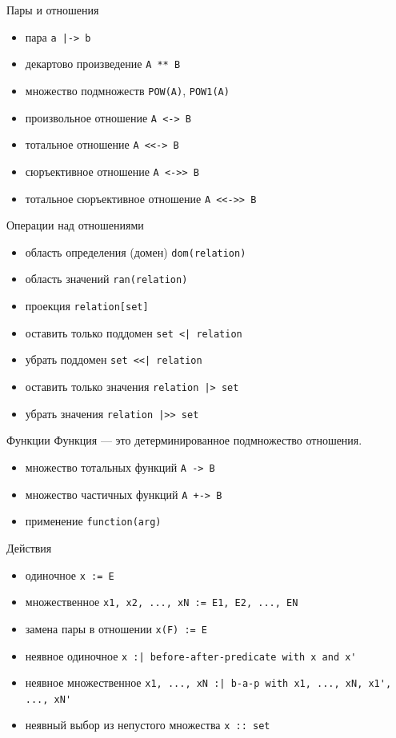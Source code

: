 \documentclass[hyperref={unicode=true}]{beamer}
\begin{document}
	\begin{frame}[fragile]{Пары и отношения}
		\begin{itemize}
			\item пара \verb`a |-> b`
			\item декартово произведение \verb|A ** B|
			\item множество подмножеств \verb|POW(A)|, \verb|POW1(A)|
			\item произвольное отношение \texttt{A <-> B}
			\item тотальное отношение \verb`A <<-> B`
			\item сюръективное отношение \verb`A <->> B`
			\item тотальное сюръективное отношение \verb`A <<->> B`
		\end{itemize}
	\end{frame}

	\begin{frame}[fragile]{Операции над отношениями}
		\begin{itemize}
			\item область определения (домен) \verb|dom(relation)|
			\item область значений \verb|ran(relation)|
			\item проекция \verb|relation[set]|
			\item оставить только поддомен \verb`set <| relation`
			\item убрать поддомен \verb`set <<| relation`
			\item оставить только значения \verb`relation |> set`
			\item убрать значения \verb`relation |>> set`
		\end{itemize}
	\end{frame}

	\begin{frame}[fragile]{Функции}
		Функция --- это детерминированное подмножество отношения.

		\begin{itemize}
			\item множество тотальных функций \verb|A -> B|
			\item множество частичных функций \verb|A +-> B|
			\item применение \verb|function(arg)|
		\end{itemize}
	\end{frame}

	\begin{frame}[fragile]{Действия}
		\begin{itemize}
			\item одиночное \verb|x := E|
			\item множественное \verb|x1, x2, ..., xN := E1, E2, ..., EN|
			\item замена пары в отношении \verb|x(F) := E|
			\item неявное одиночное  \verb`x :| before-after-predicate with x and x'`
			\item неявное множественное
			      \verb`x1, ..., xN :| b-a-p with x1, ..., xN, x1', ..., xN'`
			\item неявный выбор из непустого множества \verb`x :: set`
		\end{itemize}
	\end{frame}
\end{document}
